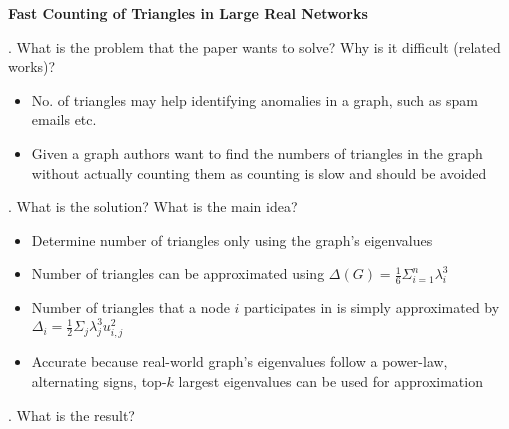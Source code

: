 \documentclass[12pt]{article}
\begin{document}
 

{\Large\centering
    \textbf{Fast Counting of Triangles in Large Real Networks}
\par}

\bigskip

. What is the problem that the paper wants to solve? Why is it difficult (related works)?

\begin{itemize}
    \item No. of triangles may help identifying anomalies in a graph, such as spam emails etc.
    \item Given a graph authors want to find the numbers of triangles in the graph without actually counting them as counting is slow and should be avoided
\end{itemize}

. What is the solution? What is the main idea?

\begin{itemize}
    \item Determine number of triangles only using the graph's eigenvalues
    \item Number of triangles can be approximated using $\Delta(G) = \frac{1}{6} \Sigma_{i=1}^n \lambda_i^3$
    \item Number of triangles that a node $i$ participates in is simply approximated by $\Delta_i = \frac{1}{2}\Sigma_j \lambda_j^3 u_{i,j}^2$
    \item Accurate because real-world graph's eigenvalues follow a power-law, alternating signs, top-$k$ largest eigenvalues can be used for approximation
\end{itemize}

. What is the result?
\end{document}
